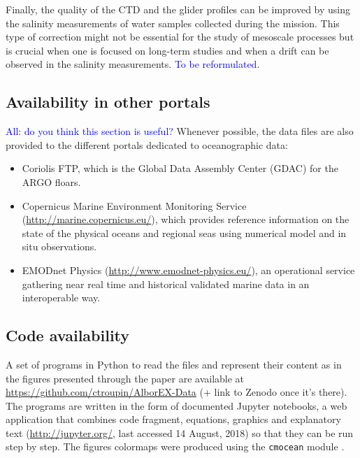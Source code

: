 \documentclass[essd]{copernicus}
\newcommand{\charles}[1]{\textcolor{blue}{#1}}
\begin{document}
Finally, the quality of the CTD and the glider profiles can be improved by using the salinity measurements of water samples collected during the mission. This type of correction might not be essential for the study of mesoscale processes but is crucial when one is focused on long-term studies and when a drift can be observed in the salinity measurements. \charles{To be reformulated}.

\subsection{Availability in other portals}

\charles{All: do you think this section is useful?}
Whenever possible, the data files are also provided to the different portals dedicated to oceanographic data:
\begin{itemize}
\item Coriolis FTP, which is the Global Data Assembly Center (GDAC) for the ARGO floars.
\item Copernicus Marine Environment Monitoring Service (\url{http://marine.copernicus.eu/}), which  provides reference information on the state of the physical oceans and regional seas using numerical model and in situ observations.
\item EMODnet Physics (\url{http://www.emodnet-physics.eu/}), an operational service gathering near real time and historical validated marine data in an interoperable way.
\end{itemize}

\subsection{Code availability}

A set of programs in Python to read the files and represent their content as in the figures presented through the paper are available at \url{https://github.com/ctroupin/AlborEX-Data} (+ link to Zenodo once it's there). The programs are written in the form of documented Jupyter notebooks, a web application that combines code fragment, equations, graphics and explanatory text (\url{http://jupyter.org/}, last accessed 14 August, 2018) so that they can be run step by step. The figures colormaps were produced using the \texttt{cmocean} module \citep{THYNG16}.

\end{document}
